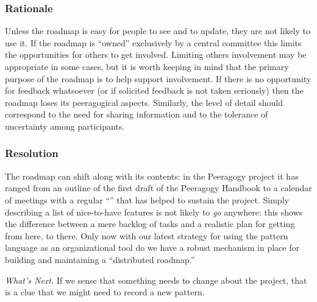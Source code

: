 \subsubsection*{Rationale} Unless the roadmap is easy for people to see and to update, they are not likely to use it. If the roadmap is ``owned'' exclusively by a central committee this limits the opportunities for others to get involved.  Limiting others involvement may be appropriate in some cases, but it is worth keeping in mind that the primary purpose of the roadmap is to help support involvement.  If there is no opportunity for feedback whatsoever (or if solicited feedback is not taken seriously) then the roadmap loses its peeragogical aspects.  Similarly, the level of detail should correspond to the need for sharing information and to the tolerance of uncertainty among participants.

\subsubsection*{Resolution}
The roadmap can shift along with its contents: in the Peeragogy project it has ranged from an outline of the first draft of the Peeragogy Handbook to a calendar of meetings with a regular ``'' that has helped to sustain the project. Simply describing a list of nice-to-have features is not likely to \emph{go} anywhere: this shows the difference between a mere backlog of tasks and a realistic plan for getting from here, to there.  Only now with our latest strategy for using the pattern language as an organizational tool do we have a robust mechanism in place for building and maintaining a ``distributed roadmap.''

\begin{framed}
\emph{What's Next.}
If we sense that something needs to change about the project, that is a clue that we might need to record a new pattern.
\end{framed}

\endgroup
    
    